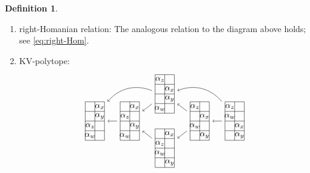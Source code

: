 \documentclass[11pt, reqno]{amsart} %
\newcommand{\strsquare}[4][]{
  \begin{scope}[every node/.append style={overlay},#1]
    \foreach \x [count=\i] in {#4}{
      \ifx\x\empty
      \else
        \pgfmathsetmacro{\modResult}{mod(\i-1, #2)}
        \pgfmathsetmacro{\quotResult}{(\i-\modResult-1)/#2}
        \node at (\modResult,-\quotResult) {\x};
      \fi
    }
    \foreach \x in {0,1,...,#2}{
      \draw ({-1/2+\x},{1/2})--({-1/2+\x},{-#3+1/2});
    }
    \foreach \y in {0,1,...,#3}{
      \draw ({-1/2},{1/2-\y})--({#2-1/2},{1/2-\y});
    }
  \end{scope}
}
\theoremstyle{definition}
\newtheorem{definition}[theorem]{Definition}
\theoremstyle{remark}
\numberwithin{equation}{section}
\begin{document}
\begin{definition}
\begin{enumerate}
\[\begin{tikzpicture}[baseline=-2pt]
      \node (S) at (-9/4,0) {\tikz[scale=0.45]{\strsquare{2}{4}{,$\alpha_x$,$\alpha_y$,,$\alpha_z$,,$\alpha_w$,}}};
      \draw [->] (P) to (Q);
      \draw [->] (Q) to (R);
      \draw [->] (R) to (S);
      \draw [->,bend right=1.5cm] (Q.north west) to (S.north east);
      \draw [->,bend right=1.5cm] (P.north west) to (S.north east);
      \node at (R.north) [transform shape,scale=.66] {$\Downarrow A_4$};
      \node at (Q.north) [anchor=south,transform shape,scale=.66] {$\Downarrow A_3$};
    \end{tikzpicture}
  \]
  where
  \begin{align*}
    A_1 &= \{\alpha_w\#_2\alpha_z,\alpha_y|\alpha_x\}, &
    A_3 &= \{\alpha_w,\alpha_z\#_2\alpha_y|\alpha_x\}, \\
    A_2 &= \{\alpha_w,\alpha_z|\alpha_x\}\#_2(\alpha_y\#_1s_1(\alpha_x)), &
    A_4 &= (\alpha_w\#_1t_1(\alpha))\#_2\{\alpha_z,\alpha_y|\alpha_x\}.
  \end{align*}
  In terms of the formula, this can be written as \eqref{eq:left-Hom}.
  \item right-Homanian relation: The analogous relation to the diagram above holds; see \eqref{eq:right-Hom}.
  \item \label{ax:Gray4-KV}KV-polytope: 
  \[
    \begin{tikzpicture}[baseline=-2pt]
      \node (A) at (2.9,0) {\tikz[baseline=-2pt,scale=.4]{\strsquare{2}{4}{$\alpha_z$,,$\alpha_w$,,,$\alpha_x$,,$\alpha_y$}}};
      \node (B) at (1.45,0) {\tikz[baseline=-2pt,scale=.4]{\strsquare{2}{4}{$\alpha_z$,,,$\alpha_x$,$\alpha_w$,,,$\alpha_y$}}};
      \node (C1) at (0,1.125) {\tikz[baseline=-2pt,scale=.4]{\strsquare{2}{4}{$\alpha_z$,,,$\alpha_x$,,$\alpha_y$,$\alpha_w$,}}};
      \node (C2) at (0,-1.125) {\tikz[baseline=-2pt,scale=.4]{\strsquare{2}{4}{,$\alpha_x$,$\alpha_z$,,$\alpha_w$,,,$\alpha_y$}}};
      \node (D) at (-1.45,0) {\tikz[baseline=-2pt,scale=.4]{\strsquare{2}{4}{,$\alpha_x$,$\alpha_z$,,,$\alpha_y$,$\alpha_w$,}}};
      \node (E) at (-2.9,0) {\tikz[baseline=-2pt,scale=.4]{\strsquare{2}{4}{,$\alpha_x$,,$\alpha_y$,$\alpha_z$,,$\alpha_w$,}}};
      \draw [->] (A) to (B);
      \draw [->] (B) to (C1);
      \draw [->] (C1) to (D);
      \draw [->] (B) to (C2);
      \draw [->] (C2) to (D);
      \draw [->] (D) to (E);
      \draw [->,bend right=1.25cm] (A) to node (P) {} (C1);
      \draw [->,bend right=1.25cm] (C1) to node (Q) {} (E);

\end{tikzpicture}\]
\end{enumerate}
\end{definition}
\end{document}
